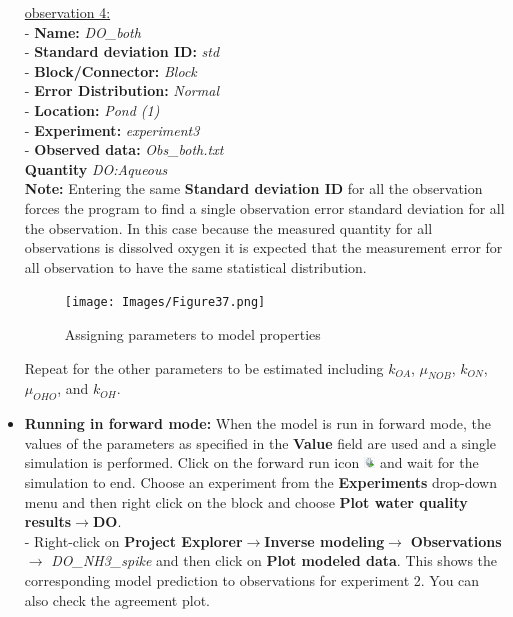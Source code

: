 \begin{itemize}
\underline{observation 4:} \\
- \textbf{Name: } \textit{DO\_both}\\
- \textbf{Standard deviation ID: } \textit{std} \\
- \textbf{Block/Connector: } \textit{Block} \\
- \textbf{Error Distribution: } \textit{Normal} \\
- \textbf{Location: } \textit{Pond (1)} \\
- \textbf{Experiment: } \textit{experiment3} \\
- \textbf{Observed data: }  \textit{Obs\_both.txt} \\
\textbf{Quantity} \textit{DO:Aqueous} \\

\textbf{Note: } Entering the same \textbf{Standard deviation ID} for all the observation forces the program to find a single observation error standard deviation for all the observation. In this case because the measured quantity for all observations is dissolved oxygen it is expected that the measurement error for all observation to have the same statistical distribution. 

\begin{figure}[!ht]
\begin{center}
\texttt{[image: Images/Figure37.png]} \\
\caption{Assigning parameters to model properties}\label{fig:inverse_example3}
\end{center}
\end{figure}    

Repeat for the other parameters to be estimated including $k_{OA}$, $\mu_{NOB}$, $k_{ON}$, $\mu_{OHO}$,
and $k_{OH}$. 

\item \textbf{Running in forward mode: } When the model is run in forward mode, the values of the parameters as specified in the \textbf{Value} field are used and a single simulation is performed. Click on the forward run icon \includegraphics[width=0.3cm]{Icons/run_icon.png} and wait for the simulation to end. Choose an experiment from the \textbf{Experiments} drop-down menu and then right click on the block and choose \textbf{Plot water quality results}$\rightarrow$\textbf{DO}. \\

- Right-click on \textbf{Project Explorer}$\rightarrow$\textbf{Inverse modeling}$\rightarrow$ \textbf{Observations}$\rightarrow$ \textit{DO\_NH3\_spike} and then click on \textbf{Plot modeled data}. This shows the corresponding model prediction to observations for experiment 2. You can also check the agreement plot. 


\end{itemize}

